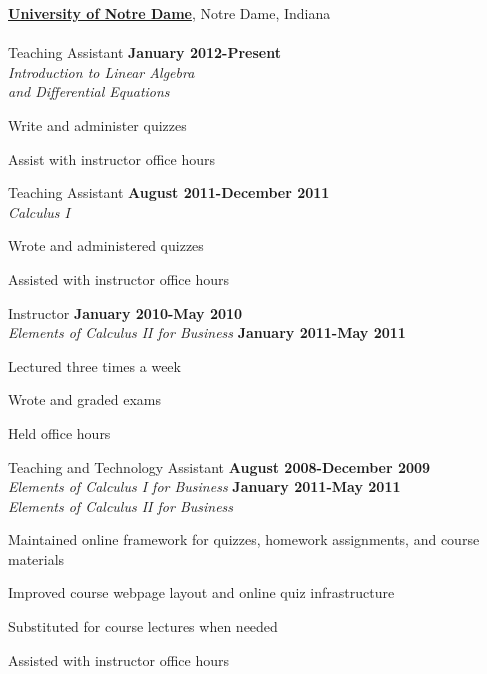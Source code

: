 \documentclass[11pt,oneside]{amsart}
\renewcommand{\section}[2]%
{\vspace{0.7cm}%
\hspace{0in}%
\marginpar{\scshape #1}#2}
\begin{document}
\section{Teaching \\ Experience}
\href{http://nd.edu/}{\textbf{University of Notre Dame}}, 
Notre Dame, Indiana
\\
\\
Teaching Assistant \hfill \textbf{January 2012-Present}
\\
\textit{Introduction to Linear Algebra \\ and Differential Equations} 
\\
\begin{compactitem}
\item Write and administer quizzes
\item Assist with instructor office hours 
\end{compactitem}
\vspace{0.4cm}
Teaching Assistant \hfill \textbf{August 2011-December 2011}
\\
\textit{Calculus I} 
\\
\begin{compactitem}
\item Wrote and administered quizzes
\item Assisted with instructor office hours 
\end{compactitem}
\vspace{0.4cm}
Instructor \hfill \textbf{January 2010-May 2010}\\ \textit{Elements of
Calculus II for Business} \hfill \textbf{January 2011-May 2011}
%
\\
\begin{compactitem}
\item Lectured three times a week
\item Wrote and graded exams 
\item Held office hours 
\end{compactitem}
\vspace{0.4cm}
Teaching and Technology Assistant \hfill \textbf{August 2008-December 2009}
\\
\textit{Elements of Calculus I for Business} \hfill \textbf{January 2011-May 2011}
\\
\textit{Elements of Calculus II 
for Business} 
\\
\begin{compactitem}
\item Maintained online framework for quizzes, homework assignments, 
and course materials
\item Improved course webpage layout and online quiz infrastructure
\item Substituted for course lectures when needed
\item Assisted with instructor office hours 
\end{compactitem}
\end{document}
